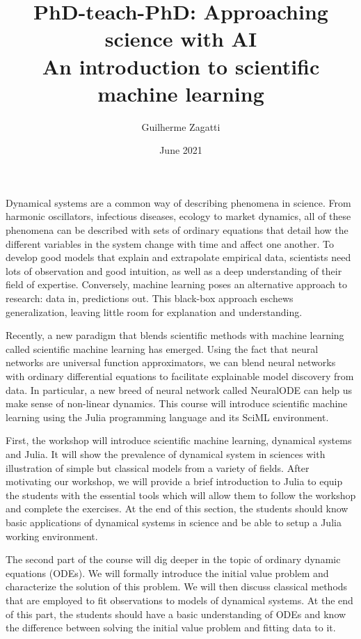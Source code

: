 \documentclass[10pt, a4paper]{article}
\title{
    \vspace{-.75in}PhD-teach-PhD: Approaching science with AI\\
    \Large{An introduction to scientific machine learning}
}
\author{Guilherme Zagatti}
\date{June 2021}
\begin{document}
\maketitle

Dynamical systems are a common way of describing phenomena in science. From harmonic oscillators, infectious diseases, ecology to market dynamics, all of these phenomena can be described with sets of ordinary equations that detail how the different variables in the system change with time and affect one another. To develop good models that explain and extrapolate empirical data, scientists need lots of observation and good intuition, as well as a deep understanding of their field of expertise. Conversely, machine learning poses an alternative approach to research: data in, predictions out. This black-box approach eschews generalization, leaving little room for explanation and understanding.

Recently, a new paradigm that blends scientific methods with machine learning called scientific machine learning has emerged. Using the fact that neural networks are universal function approximators, we can blend neural networks with ordinary differential equations to facilitate explainable model discovery from data. In particular, a new breed of neural network called NeuralODE can help us make sense of non-linear dynamics. This course will introduce scientific machine learning using the Julia programming language and its SciML environment.

First, the workshop will introduce scientific machine learning, dynamical systems and Julia. It will show the prevalence of dynamical system in sciences with illustration of simple but classical models from a variety of fields. After motivating our workshop, we will provide a brief introduction to Julia to equip the students with the essential tools which will allow them to follow the workshop and complete the exercises. At the end of this section, the students should know basic applications of dynamical systems in science and be able to setup a Julia working environment.

The second part of the course will dig deeper in the topic of ordinary dynamic equations (ODEs). We will formally introduce the initial value problem and characterize the solution of this problem. We will then discuss classical methods that are employed to fit observations to models of dynamical systems. At the end of this part, the students should have a basic understanding of ODEs and know the difference between solving the initial value problem and fitting data to it.
\end{document}
